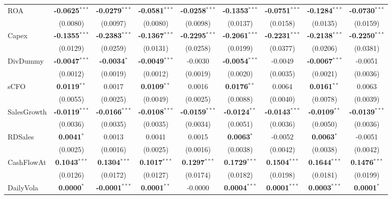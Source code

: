 \documentclass[11pt,a4paper]{article}
\begin{document}
\begin{table}[htbp]
\begin{tabular}{lcccccccc}
ROA & \textbf{-0.0625}$^{***}$ & \textbf{-0.0279}$^{***}$ & \textbf{-0.0581}$^{***}$ & \textbf{-0.0258}$^{***}$ & \textbf{-0.1353}$^{***}$ & \textbf{-0.0751}$^{***}$ & \textbf{-0.1284}$^{***}$ & \textbf{-0.0730}$^{***}$ \\
 & (0.0080) & (0.0097) & (0.0080) & (0.0098) & (0.0137) & (0.0158) & (0.0135) & (0.0159) \\
Capex & \textbf{-0.1355}$^{***}$ & \textbf{-0.2383}$^{***}$ & \textbf{-0.1367}$^{***}$ & \textbf{-0.2295}$^{***}$ & \textbf{-0.2061}$^{***}$ & \textbf{-0.2231}$^{***}$ & \textbf{-0.2138}$^{***}$ & \textbf{-0.2250}$^{***}$ \\
 & (0.0129) & (0.0259) & (0.0131) & (0.0258) & (0.0199) & (0.0377) & (0.0206) & (0.0381) \\
DivDummy & \textbf{-0.0047}$^{***}$ & \textbf{-0.0034}$^{*}$ & \textbf{-0.0049}$^{***}$ & -0.0030 & \textbf{-0.0054}$^{***}$ & -0.0049 & \textbf{-0.0067}$^{***}$ & -0.0051 \\
 & (0.0012) & (0.0019) & (0.0012) & (0.0019) & (0.0020) & (0.0035) & (0.0021) & (0.0036) \\
sCFO & \textbf{0.0119}$^{**}$ & 0.0017 & \textbf{0.0109}$^{**}$ & 0.0016 & \textbf{0.0176}$^{**}$ & 0.0064 & \textbf{0.0161}$^{**}$ & 0.0063 \\
 & (0.0055) & (0.0025) & (0.0049) & (0.0025) & (0.0088) & (0.0040) & (0.0078) & (0.0039) \\
SalesGrowth & \textbf{-0.0119}$^{***}$ & \textbf{-0.0166}$^{***}$ & \textbf{-0.0108}$^{***}$ & \textbf{-0.0159}$^{***}$ & \textbf{-0.0124}$^{**}$ & \textbf{-0.0143}$^{***}$ & \textbf{-0.0109}$^{**}$ & \textbf{-0.0139}$^{***}$ \\
 & (0.0036) & (0.0035) & (0.0035) & (0.0034) & (0.0051) & (0.0036) & (0.0050) & (0.0036) \\
RDSales & \textbf{0.0041}$^{*}$ & 0.0013 & 0.0041 & 0.0015 & \textbf{0.0063}$^{*}$ & -0.0052 & \textbf{0.0063}$^{*}$ & -0.0051 \\
 & (0.0025) & (0.0016) & (0.0025) & (0.0016) & (0.0038) & (0.0042) & (0.0038) & (0.0042) \\
CashFlowAt & \textbf{0.1043}$^{***}$ & \textbf{0.1304}$^{***}$ & \textbf{0.1017}$^{***}$ & \textbf{0.1297}$^{***}$ & \textbf{0.1729}$^{***}$ & \textbf{0.1504}$^{***}$ & \textbf{0.1644}$^{***}$ & \textbf{0.1476}$^{***}$ \\
 & (0.0126) & (0.0172) & (0.0127) & (0.0174) & (0.0182) & (0.0198) & (0.0181) & (0.0199) \\
DailyVola & \textbf{0.0000}$^{*}$ & \textbf{-0.0001}$^{***}$ & \textbf{0.0001}$^{**}$ & -0.0000 & \textbf{0.0004}$^{***}$ & \textbf{0.0001}$^{***}$ & \textbf{0.0003}$^{***}$ & \textbf{0.0001}$^{*}$ \\

\end{tabular}
\end{table}
\end{document}
